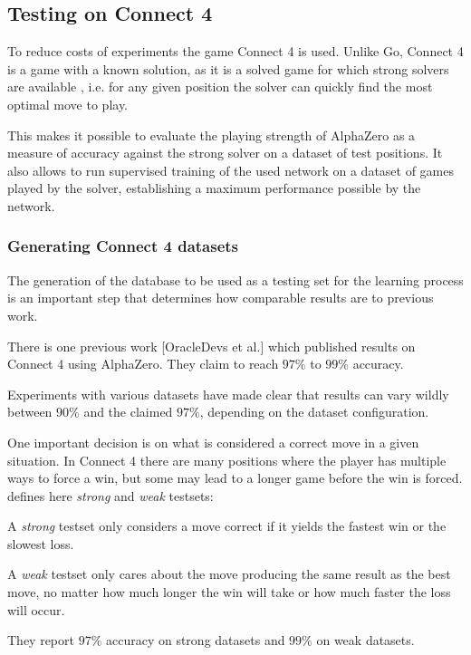 \documentclass[12pt,onecolumn,oneside,titlepage]{article}
\begin{document}
\subsection{Testing on Connect 4}

To reduce costs of experiments the game Connect 4 is used. Unlike Go, Connect 4 is a game with a known solution, as it is a solved game for which strong solvers are available \cite{trompsolved, pascalsolver, pascalsolvergithub}, 
i.e. for any given position the solver can quickly find the most optimal move to play.

This makes it possible to evaluate the playing strength of AlphaZero as a measure of accuracy against the strong solver on a dataset of test positions.
It also allows to run supervised training of the used network on a dataset of games played by the solver, establishing a maximum performance possible by the network.

\subsubsection{Generating Connect 4 datasets}
\label{s:generate_dataset}


The generation of the database to be used as a testing set for the learning process is an important step that determines how comparable results are to previous work. 

There is one previous work \cite{oracledevs}[OracleDevs et al.] which published results on Connect 4 using AlphaZero. They claim to reach $97\%$ to $99\%$ accuracy.

Experiments with various datasets have made clear that results can vary wildly between $90\%$ and the claimed $97\%$, depending on the dataset configuration.

One important decision is on what is considered a correct move in a given situation. In Connect 4 there are many positions where the player has multiple ways to force a win, but some may lead to a longer game before the win is forced.
\cite{oracledevs} defines here \emph{strong} and \emph{weak} testsets: 

A \emph{strong} testset only considers a move correct if it yields the fastest win or the slowest loss. 

A \emph{weak} testset only cares about the move producing the same result 
as the best move, no matter how much longer the win will take or how much faster the loss will occur.

They report $97\%$ accuracy on strong datasets and $99\%$ on weak datasets.
\end{document}
